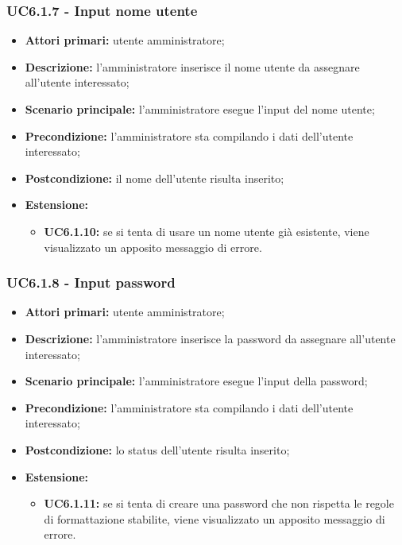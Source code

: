 \subsubsection{UC6.1.7 - Input nome utente}
	\begin{itemize}
		\item \textbf{Attori primari:} utente amministratore;
		\item \textbf{Descrizione:} l'amministratore inserisce il nome utente da assegnare all'utente interessato;
		\item \textbf{Scenario principale:} l'amministratore esegue l'input del nome utente;
		\item \textbf{Precondizione:} l'amministratore sta compilando i dati dell'utente interessato;
		\item \textbf{Postcondizione:} il nome dell'utente risulta inserito;
		\item \textbf{Estensione:}
		\begin{itemize}
			\item \textbf{UC6.1.10:} se si tenta di usare un nome utente già esistente, viene visualizzato un apposito messaggio di errore.
		\end{itemize}
	\end{itemize}

\subsubsection{UC6.1.8 - Input password}
	\begin{itemize}
		\item \textbf{Attori primari:} utente amministratore;
		\item \textbf{Descrizione:} l'amministratore inserisce la password da assegnare all'utente interessato;
		\item \textbf{Scenario principale:} l'amministratore esegue l'input della password;
		\item \textbf{Precondizione:} l'amministratore sta compilando i dati dell'utente interessato;
		\item \textbf{Postcondizione:} lo status dell'utente risulta inserito;
		\item \textbf{Estensione:}
		\begin{itemize}
			\item \textbf{UC6.1.11:} se si tenta di creare una password che non rispetta le regole di formattazione stabilite, viene visualizzato un apposito messaggio di errore.
		\end{itemize}
	\end{itemize}

